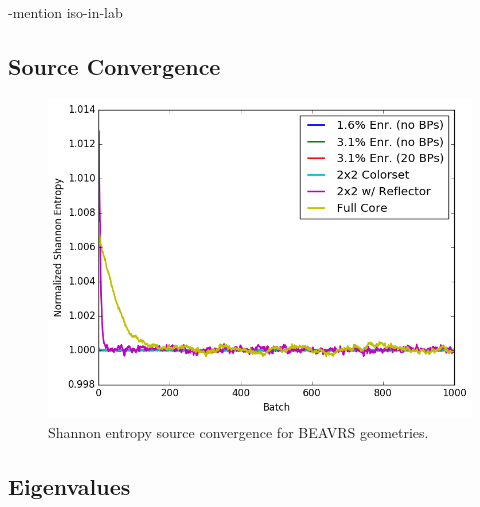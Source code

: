 -mention iso-in-lab

\subsection{Source Convergence}
\label{subsec:chap7-src-converge}

\begin{figure}[h!]
  \centering
  \includegraphics[width=0.9\linewidth]{figures/benchmarks/entropy/entropy-all}
\caption[Shannon entropy source convergence for BEAVRS geometries]{Shannon entropy source convergence for BEAVRS geometries.}
\label{fig:chap7-entropy}
\end{figure}



\subsection{Eigenvalues}
\label{subsec:chap7-eigenvalues}

